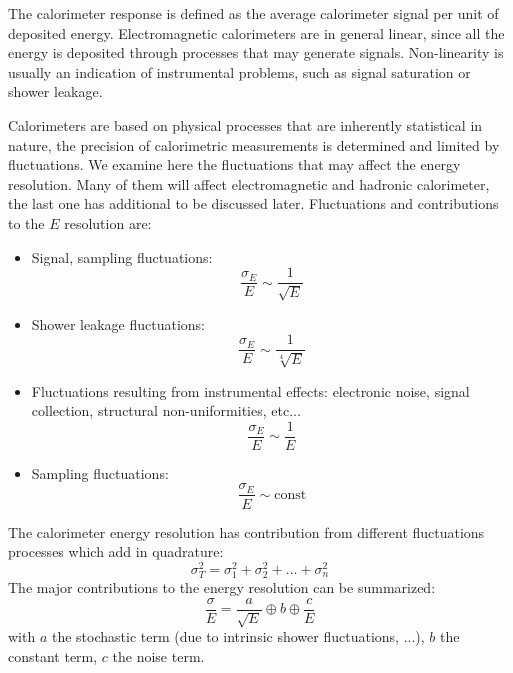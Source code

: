 \documentclass[../../main/main.tex]{subfiles}
\begin{document}
The calorimeter response is defined as the average calorimeter signal per unit of deposited energy. Electromagnetic calorimeters are in general linear, since all the energy is deposited through processes that may generate signals. Non-linearity is usually an indication of instrumental problems, such as signal saturation or shower leakage.

Calorimeters are based on physical processes that are inherently statistical in nature, the precision of calorimetric measurements is determined and limited by fluctuations. We examine here the fluctuations that may affect the energy resolution. Many of them will affect electromagnetic and hadronic calorimeter, the last one has additional to be discussed later. Fluctuations and contributions to the \( E \) resolution are:
\begin{itemize}
	\item Signal, sampling fluctuations:
		\begin{equation}
			\frac{\sigma_E}{E}
			\sim
			\frac{1}{\sqrt{E}}
			\label{eq:}
		\end{equation}

	\item Shower leakage fluctuations:
		\begin{equation}
			\frac{\sigma_E}{E}
			\sim
			\frac{1}{\sqrt[4]{E}}
			\label{eq:}
		\end{equation}

	\item Fluctuations resulting from instrumental effects: electronic noise, signal collection, structural non-uniformities, etc...
		\begin{equation}
			\frac{\sigma_E}{E}
			\sim
			\frac{1}{E}
			\label{eq:}
		\end{equation}

	\item Sampling fluctuations:
		\begin{equation}
			\frac{\sigma_E}{E}
			\sim
			\text{const}
			\label{eq:}
		\end{equation}
\end{itemize}

The calorimeter energy resolution has contribution from different fluctuations processes which add in quadrature:
\begin{equation}
	\sigma_T^2
	=
	\sigma_1^2 + \sigma_2^2 + \dots + \sigma_n^2
	\label{eq:}
\end{equation}
The major contributions to the energy resolution can be summarized:
\begin{equation}
	\frac{\sigma}{E}
	=
	\frac{a}{\sqrt{E}} \oplus b \oplus \frac{c}{E}
	\label{eq:}
\end{equation}
with \( a \) the stochastic term (due to intrinsic shower fluctuations, ...), \( b \) the constant term, \( c \) the noise term.
\end{document}
